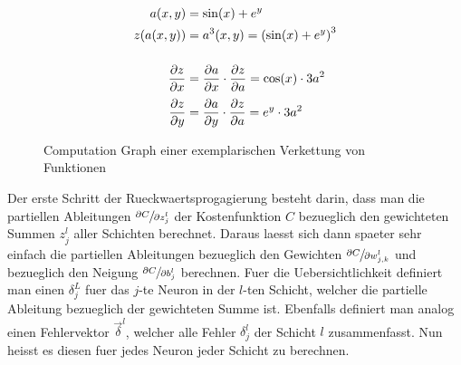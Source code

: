 \documentclass[../main]{subfiles}
\begin{document}
\begin{figure}[h!]
  \begin{minipage}[h!]{0.5\textwidth}
    \centering

  \end{minipage}
  \begin{minipage}[h!]{0.5\textwidth}
    \begin{align*} %
      a(x,y) &= \sin(x) + e^y \\
      z(a(x,y)) &= a^3(x,y) = \left(\sin(x) + e^y\right)^3 \\[3ex]
      \partderiv{z}{x} &= \partderiv{a}{x} \cdot  \partderiv{z}{a} = \cos(x) \cdot 3a^2 \\[0.5ex]
      \partderiv{z}{y} &= \partderiv{a}{y} \cdot \partderiv{z}{a} = e^y \cdot 3a^2
    \end{align*}
  \end{minipage}

  \caption{Computation Graph einer exemplarischen Verkettung von Funktionen}
  \label{fig:computation_graph}
\end{figure}

Der erste Schritt der Rueckwaertsprogagierung besteht darin, dass man die partiellen Ableitungen $\sfrac{\partial C}{\partial z_j^l}$
der Kostenfunktion $C$ bezueglich den gewichteten Summen $z_j^l$ aller Schichten
berechnet. Daraus laesst sich dann spaeter sehr einfach die partiellen Ableitungen
bezueglich den Gewichten $\sfrac{\partial C}{\partial w_{j,k}^l}$ und bezueglich den Neigung
$\sfrac{\partial C}{\partial b_j^l}$ berechnen.
\para{}
Fuer die Uebersichtlichkeit definiert man einen  $\delta_j^L$ fuer
das $j$-te Neuron in der $l$-ten Schicht, welcher die partielle Ableitung bezueglich der
gewichteten Summe ist. Ebenfalls definiert man analog einen Fehlervektor
$\vec{\delta}^l$, welcher alle Fehler $\delta_j^l$ der Schicht $l$
zusammenfasst. Nun heisst es diesen fuer jedes Neuron jeder Schicht zu
berechnen.
\end{document}
